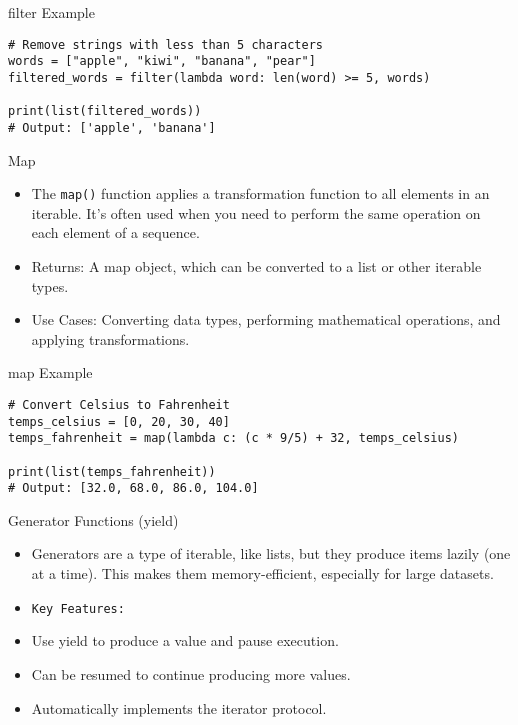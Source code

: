 \documentclass[serif, aspectratio=169]{beamer}
\begin{document}
\begin{frame}[fragile]{filter Example}
	\begin{lstlisting}
# Remove strings with less than 5 characters
words = ["apple", "kiwi", "banana", "pear"]
filtered_words = filter(lambda word: len(word) >= 5, words)

print(list(filtered_words))  
# Output: ['apple', 'banana']
	\end{lstlisting}
\end{frame}

\begin{frame}{Map}
    \begin{itemize}
        \item The \texttt{\color{red}map()} function applies a transformation function to all elements in an iterable. It’s often used when you need to perform the same operation on each element of a sequence.
        \item Returns: A map object, which can be converted to a list or other iterable types.
        \item Use Cases: Converting data types, performing mathematical operations, and applying transformations.
    \end{itemize}
\end{frame}

\begin{frame}[fragile]{map Example}
    \begin{lstlisting}
# Convert Celsius to Fahrenheit
temps_celsius = [0, 20, 30, 40]
temps_fahrenheit = map(lambda c: (c * 9/5) + 32, temps_celsius)

print(list(temps_fahrenheit)) 
# Output: [32.0, 68.0, 86.0, 104.0]
    \end{lstlisting}
\end{frame}

\begin{frame}{Generator Functions (yield)}
    \begin{itemize}
        \item Generators are a type of iterable, like lists, but they produce items lazily (one at a time). This makes them memory-efficient, especially for large datasets.

        \item \texttt{\color{red}Key Features:}
        \item Use yield to produce a value and pause execution.
        \item Can be resumed to continue producing more values.
        \item Automatically implements the iterator protocol.
    \end{itemize}
\end{frame}
\end{document}
